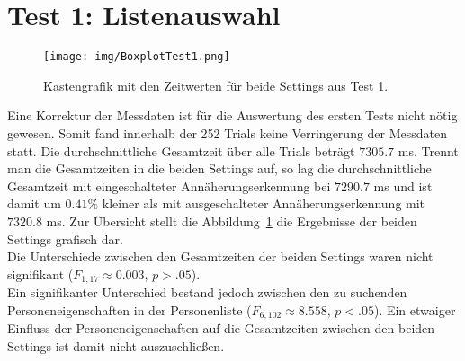 \documentclass[12pt,numbers=noenddot,parskip,bibliography=totocnumbered,listof=totocnumbered]{scrreprt}
\begin{document}
\section{Test 1: Listenauswahl}
\begin{figure}
\centering
\texttt{[image: img/BoxplotTest1.png]}
\caption{Kastengrafik mit den Zeitwerten für beide Settings aus Test 1.}
\label{ergebnistest1}
\end{figure}
Eine Korrektur der Messdaten ist für die Auswertung des ersten Tests nicht nötig gewesen. Somit fand innerhalb der 252 Trials keine Verringerung der Messdaten statt. Die durchschnittliche Gesamtzeit über alle Trials beträgt $7305.7$ ms. Trennt man die Gesamtzeiten in die beiden Settings auf, so lag die durchschnittliche Gesamtzeit mit eingeschalteter Annäherungserkennung bei $7290.7$ ms und ist damit um $0.41\%$ kleiner als mit ausgeschalteter Annäherungserkennung mit $7320.8$ ms. Zur Übersicht stellt die Abbildung~\ref{ergebnistest1} die Ergebnisse der beiden Settings grafisch dar.\\
Die Unterschiede zwischen den Gesamtzeiten der beiden Settings waren nicht signifikant ($F_{1,17}\approx 0.003$, $p > .05$).\\
Ein signifikanter Unterschied bestand jedoch zwischen den zu suchenden Personeneigenschaften in der Personenliste ($F_{6,102}\approx 8.558$, $p < .05$). Ein etwaiger Einfluss der Personeneigenschaften auf die Gesamtzeiten zwischen den beiden Settings ist damit nicht auszuschließen.
\end{document}
